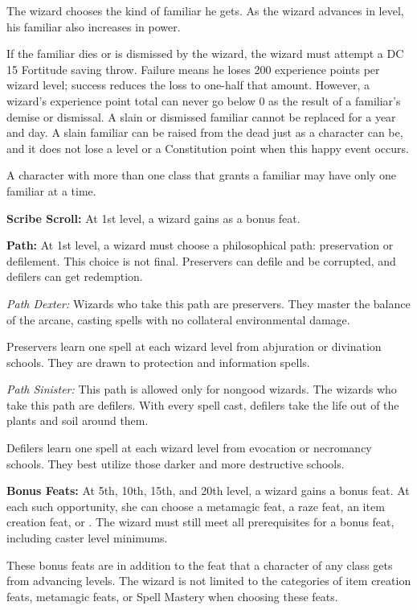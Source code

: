 The wizard chooses the kind of familiar he gets. As the wizard advances in level, his familiar also increases in power.

If the familiar dies or is dismissed by the wizard, the wizard must attempt a DC 15 Fortitude saving throw. Failure means he loses 200 experience points per wizard level; success reduces the loss to one-half that amount. However, a wizard's experience point total can never go below 0 as the result of a familiar's demise or dismissal. A slain or dismissed familiar cannot be replaced for a year and day. A slain familiar can be raised from the dead just as a character can be, and it does not lose a level or a Constitution point when this happy event occurs.

A character with more than one class that grants a familiar may have only one familiar at a time.

\textbf{Scribe Scroll:} At 1st level, a wizard gains  as a bonus feat.

\textbf{Path:} At 1st level, a wizard must choose a philosophical path: preservation or defilement. This choice is not final. Preservers can defile and be corrupted, and defilers can get redemption.

\textit{Path Dexter:} Wizards who take this path are preservers. They master the balance of the arcane, casting spells with no collateral environmental damage.

Preservers learn one spell at each wizard level from abjuration or divination schools. They are drawn to protection and information spells.

\textit{Path Sinister:} This path is allowed only for nongood wizards. The wizards who take this path are defilers. With every spell cast, defilers take the life out of the plants and soil around them.

Defilers learn one spell at each wizard level from evocation or necromancy schools. They best utilize those darker and more destructive schools.

\textbf{Bonus Feats:} At 5th, 10th, 15th, and 20th level, a wizard gains a bonus feat. At each such opportunity, she can choose a metamagic feat, a raze feat, an item creation feat, or . The wizard must still meet all prerequisites for a bonus feat, including caster level minimums.

These bonus feats are in addition to the feat that a character of any class gets from advancing levels. The wizard is not limited to the categories of item creation feats, metamagic feats, or Spell Mastery when choosing these feats.

